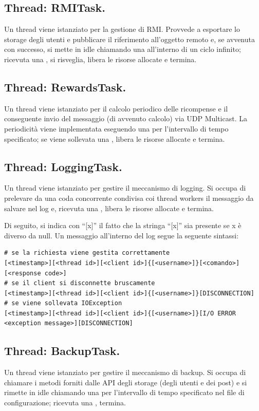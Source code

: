 \documentclass[11pt, italian, openany]{book}
\begin{document}
\begin{sloppypar}
\subsection*{Thread: RMITask.}
Un thread  viene istanziato per la gestione di RMI. Provvede a esportare lo storage degli utenti e pubblicare il riferimento
all'oggetto remoto e, se avvenuta con successo, si mette in idle chiamando una  all'interno di un ciclo infinito; ricevuta
una , si risveglia, libera le risorse allocate e termina.

\subsection*{Thread: RewardsTask.}
Un thread  viene istanziato per il calcolo periodico delle ricompense e il conseguente invio del messaggio (di avvenuto
calcolo) via UDP Multicast. La periodicit\`a viene implementata eseguendo una  per l'intervallo di tempo specificato; se viene
sollevata una , libera le risorse allocate e termina.

\subsection*{Thread: LoggingTask.}
Un thread  viene istanziato per gestire il meccanismo di logging. Si occupa di prelevare da una coda concorrente condivisa
coi thread workers il messaggio da salvare nel log e, ricevuta una , libera le risorse allocate e termina.

Di seguito, si indica con ``{[x]}'' il fatto che la stringa ``[x]'' sia presente se x \`e diverso da null.
Un messaggio all'interno del log segue la seguente sintassi:
\begin{lstlisting}[style=code]
# se la richiesta viene gestita correttamente
[<timestamp>][<thread id>][<client id>]{[<username>]}[<comando>][<response code>]
# se il client si disconnette bruscamente
[<timestamp>][<thread id>][<client id>]{[<username>]}[DISCONNECTION]
# se viene sollevata IOException
[<timestamp>][<thread id>][<client id>]{[<username>]}[I/O ERROR <exception message>][DISCONNECTION]
\end{lstlisting}

\subsection*{Thread: BackupTask.}
Un thread  viene istanziato per gestire il meccanismo di backup. Si occupa di chiamare i metodi forniti dalle API degli
storage (degli utenti e dei post) e si rimette in idle chiamando una  per l'intervallo di tempo specificato nel file di
configurazione; ricevuta una , termina.


\end{sloppypar}
\end{document}
